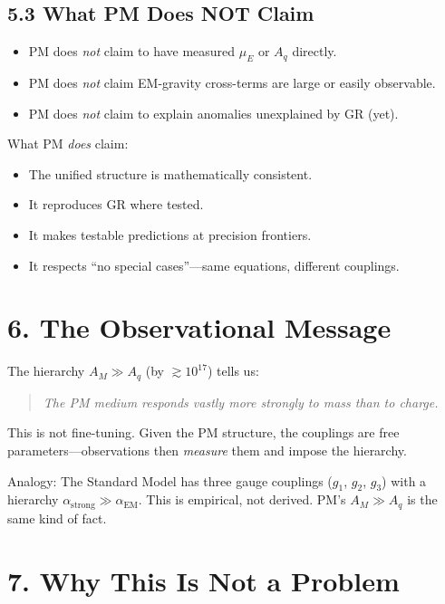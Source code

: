 \documentclass{article}
\begin{document}
\subsection*{5.3 What PM Does NOT Claim}

\begin{itemize}
    \item PM does \emph{not} claim to have measured $\mu_E$ or $A_q$ directly.
    \item PM does \emph{not} claim EM-gravity cross-terms are large or easily observable.
    \item PM does \emph{not} claim to explain anomalies unexplained by GR (yet).
\end{itemize}

What PM \emph{does} claim:

\begin{itemize}
    \item The unified structure is mathematically consistent.
    \item It reproduces GR where tested.
    \item It makes testable predictions at precision frontiers.
    \item It respects ``no special cases''—same equations, different couplings.
\end{itemize}

\section*{6. The Observational Message}

The hierarchy $A_M \gg A_q$ (by $\gtrsim 10^{17}$) tells us:

\begin{quote}
\emph{The PM medium responds vastly more strongly to mass than to charge.}
\end{quote}

This is not fine-tuning. Given the PM structure, the couplings are free
parameters—observations then \emph{measure} them and impose the hierarchy.

Analogy: The Standard Model has three gauge couplings ($g_1$, $g_2$, $g_3$)
with a hierarchy $\alpha_{\text{strong}} \gg \alpha_{\text{EM}}$. This is
empirical, not derived. PM's $A_M \gg A_q$ is the same kind of fact.

\section*{7. Why This Is Not a Problem}
\end{document}
